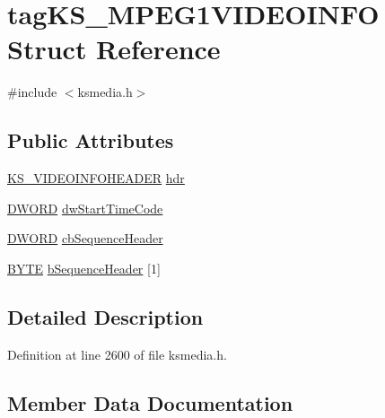 \hypertarget{structtag_k_s___m_p_e_g1_v_i_d_e_o_i_n_f_o}{}\section{tag\+K\+S\+\_\+\+M\+P\+E\+G1\+V\+I\+D\+E\+O\+I\+N\+FO Struct Reference}
\label{structtag_k_s___m_p_e_g1_v_i_d_e_o_i_n_f_o}


{\ttfamily \#include $<$ksmedia.\+h$>$}

\subsection*{Public Attributes}
\begin{DoxyCompactItemize}
\item 
\hyperlink{ksmedia_8h_ade1656979c41e0f7252475edf5e86528}{K\+S\+\_\+\+V\+I\+D\+E\+O\+I\+N\+F\+O\+H\+E\+A\+D\+ER} \hyperlink{structtag_k_s___m_p_e_g1_v_i_d_e_o_i_n_f_o_a167f2697e65b70f93a1011177fb62b3a}{hdr}
\item 
\hyperlink{mapinls_8h_ad342ac907eb044443153a22f964bf0af}{D\+W\+O\+RD} \hyperlink{structtag_k_s___m_p_e_g1_v_i_d_e_o_i_n_f_o_aa7c29af6637207cd8da2f9d4bfc74b9e}{dw\+Start\+Time\+Code}
\item 
\hyperlink{mapinls_8h_ad342ac907eb044443153a22f964bf0af}{D\+W\+O\+RD} \hyperlink{structtag_k_s___m_p_e_g1_v_i_d_e_o_i_n_f_o_acc9b4707eff47ec95310af139b2c7cc6}{cb\+Sequence\+Header}
\item 
\hyperlink{mapinls_8h_a4ae1dab0fb4b072a66584546209e7d58}{B\+Y\+TE} \hyperlink{structtag_k_s___m_p_e_g1_v_i_d_e_o_i_n_f_o_ae858547ee2c36affb23df65567845ddd}{b\+Sequence\+Header} \mbox{[}1\mbox{]}
\end{DoxyCompactItemize}


\subsection{Detailed Description}


Definition at line 2600 of file ksmedia.\+h.



\subsection{Member Data Documentation}
